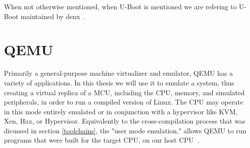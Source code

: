 When not otherwise mentioned, when U-Boot is mentioned we are refering to U-Boot maintained by denx~\cite{u-boot}.

\section {QEMU}\label{qemu.ch}
Primarily a general-purpose machine virtualizer and emulator, QEMU has a variety of applications. In this thesis we will use it to emulate a system, thus creating a virtual replica of a MCU, including the CPU, memory, and simulated peripherals, in order to run a compiled version of Linux. The CPU may operate in this mode entirely emulated or in conjunction with a hypervisor like KVM, Xen, Hax, or Hypervisor. Equivalently to the cross-compilation process that was dicussed in section \ref{toolchains}, the "user mode emulation," allows QEMU to run programs that were built for the target CPU, on our host CPU~\cite{qemu}.

